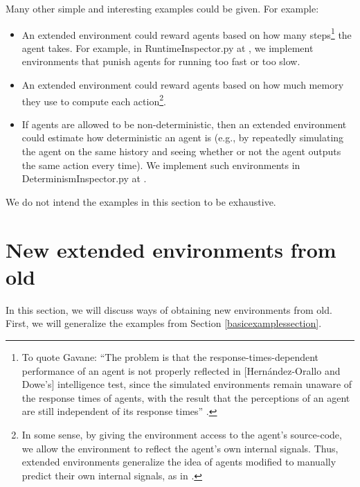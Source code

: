 \documentclass[runningheads]{llncs}
\begin{document}
Many other simple and interesting examples could be given. For example:
\begin{itemize}
    \item
    An extended environment could reward agents based on how many steps\footnote{To quote
    Gavane: ``The problem is that the response-times-dependent performance of an agent
    is not properly reflected in [Hern{\'a}ndez-Orallo and Dowe's] intelligence test,
    since the simulated environments remain unaware of the response times of agents,
    with the result that the perceptions of an agent are still independent of its
    response times'' \cite{gavane}.} the agent takes. For example, in
    RuntimeInspector.py at \cite{library}, we implement environments that punish
    agents for running too fast or too slow.
    \item
    An extended environment could reward agents based on how much memory
    they use to compute each action\footnote{In some sense, by giving the environment
    access to the agent's source-code, we allow the environment to reflect the agent's
    own internal signals. Thus, extended environments generalize the idea of
    agents modified to manually predict their own internal signals, as in
    \cite{sherstan2016introspective}.}.
    \item
    If agents are allowed to be non-deterministic, then an extended environment
    could estimate how deterministic an agent is (e.g., by repeatedly simulating
    the agent on the same history and seeing whether or not the agent outputs the same
    action every time). We implement such environments in
    DeterminismInspector.py at \cite{library}.
\end{itemize}
We do not intend the examples in this section to be exhaustive.

\section{New extended environments from old}
\label{newextendedenvironmentsfromoldsecn}

In this section, we will discuss ways of obtaining new environments from old.
First, we will generalize the examples from Section \ref{basicexamplessection}.
\end{document}
